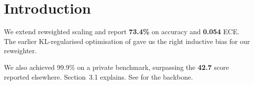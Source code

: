 \documentclass{article}
\begin{document}
\section{Introduction}
We extend reweighted scaling \cite{snell2024scaling} and report \textbf{73.4\%}
on accuracy and \textbf{0.054} ECE. The earlier KL-regularised optimisation
of \cite{kingma2014adam} gave us the right inductive bias for our reweighter.

We also achieved 99.9\% on a private benchmark, surpassing the \textbf{42.7}
score reported elsewhere. Section~3.1 explains. See \cite{ghost2099} for the
backbone.
\end{document}
